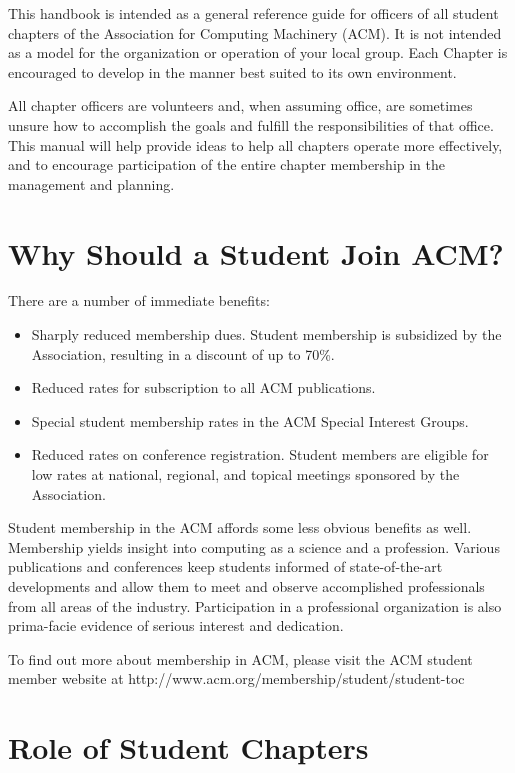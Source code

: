 This handbook is intended as a general reference guide for officers of all
student chapters of the Association for Computing Machinery (ACM). It is not
intended as a model for the organization or operation of your local group.
Each Chapter is encouraged to develop in the manner best suited to its own
environment.

All chapter officers are volunteers and, when assuming office, are sometimes
unsure how to accomplish the goals and fulfill the responsibilities of that
office. This manual will help provide ideas to help all chapters operate more
effectively, and to encourage participation of the entire chapter membership in
the management and planning.

\section{Why Should a Student Join ACM?}
\label{sec:sec03}

There are a number of immediate benefits:
  \begin{itemize}
    \item Sharply reduced membership dues. Student membership is subsidized by
          the Association, resulting in a discount of up to 70\%.
    \item Reduced rates for subscription to all ACM publications.
    \item Special student membership rates in the ACM Special Interest Groups.
    \item Reduced rates on conference registration. Student members are eligible
          for low rates at national, regional, and topical meetings sponsored by
          the Association.
  \end{itemize}

Student membership in the ACM affords some less obvious benefits as well.
Membership yields insight into computing as a science and a profession.
Various publications and conferences keep students informed of state-of-the-art
developments and allow them to meet and observe accomplished professionals from
all areas of the industry. Participation in a professional organization is also
prima-facie evidence of serious interest and dedication.

To find out more about membership in ACM, please visit the ACM student member
website at http://www.acm.org/membership/student/student-toc

\section{Role of Student Chapters}
\label{sec:sec04}

